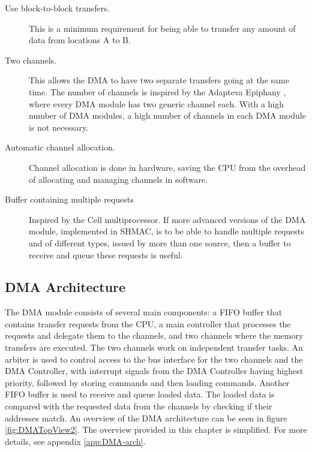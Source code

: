 \begin{description}
	\item[Use block-to-block transfers.] This is a minimum requirement for being
	able to transfer any amount of data from locations A to B.
	\item[Two channels.] This allows the DMA to have two separate transfers going
	at the same time.
	The number of channels is inspired by the Adapteva Epiphany \cite{epiphany}, where every DMA module has two generic channel each.
	With a high number of DMA modules, a high number of channels in each DMA module is not necessary.
	\item[Automatic channel allocation.] Channel allocation is done in hardware,
	saving the CPU from the overhead of allocating and managing channels in software.
	\item[Buffer containing multiple requests] Inspired by the Cell multiprocessor.
	If more advanced versions of the DMA module, implemented in SHMAC, is to be able to handle multiple requests and of different types, issued by more than one source, then a buffer to receive and queue these requests is useful.
\end{description}

\subsection{DMA Architecture}

The DMA module consists of several main components: a FIFO buffer that contains transfer requests from the CPU, a main controller that processes the requests and delegate them to the channels, and two channels where the memory transfers are executed.
The two channels work on independent transfer tasks.
An arbiter is used to control access to the bus interface for the two channels and the DMA Controller, with interrupt signals from the DMA Controller having highest priority, followed by storing commands and then loading commands.
Another FIFO buffer is used to receive and queue loaded data.
The loaded data is compared with the requested data from the channels by checking if their addresses match. 
An overview of the DMA architecture can be seen in figure \ref{fig:DMATopView2}.
The overview provided in this chapter is simplified.
For more details, see appendix \ref{app:DMA-arch}.

